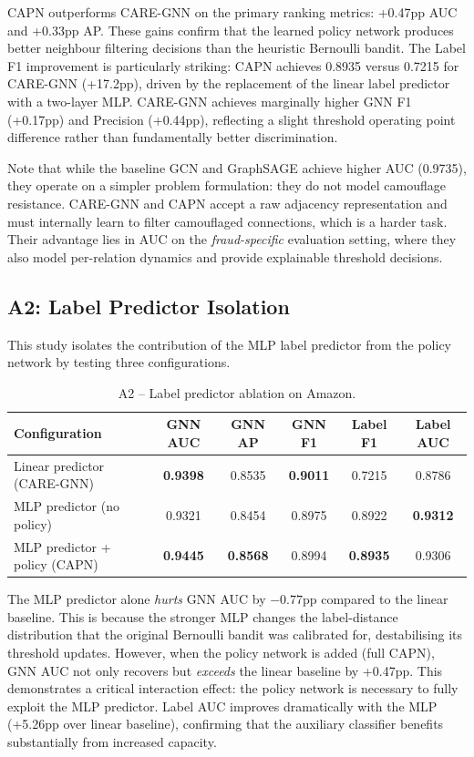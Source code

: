 \noindent
CAPN outperforms CARE-GNN on the primary ranking metrics: +0.47pp AUC and +0.33pp AP. These gains confirm that the learned policy network produces better neighbour filtering decisions than the heuristic Bernoulli bandit. The Label F1 improvement is particularly striking: CAPN achieves 0.8935 versus 0.7215 for CARE-GNN (+17.2pp), driven by the replacement of the linear label predictor with a two-layer MLP. CARE-GNN achieves marginally higher GNN F1 (+0.17pp) and Precision (+0.44pp), reflecting a slight threshold operating point difference rather than fundamentally better discrimination.

Note that while the baseline GCN and GraphSAGE achieve higher AUC (0.9735), they operate on a simpler problem formulation: they do not model camouflage resistance. CARE-GNN and CAPN accept a raw adjacency representation and must internally learn to filter camouflaged connections, which is a harder task. Their advantage lies in AUC on the \textit{fraud-specific} evaluation setting, where they also model per-relation dynamics and provide explainable threshold decisions.


\subsection{A2: Label Predictor Isolation}

This study isolates the contribution of the MLP label predictor from the policy network by testing three configurations.

\begin{table}[h!]
\centering
\begin{tabular}{lccccc}
\toprule
\textbf{Configuration} & \textbf{GNN AUC} & \textbf{GNN AP} & \textbf{GNN F1} & \textbf{Label F1} & \textbf{Label AUC} \\
\midrule
Linear predictor (CARE-GNN) & \textbf{0.9398} & 0.8535 & \textbf{0.9011} & 0.7215 & 0.8786 \\
MLP predictor (no policy)   & 0.9321 & 0.8454 & 0.8975 & 0.8922 & \textbf{0.9312} \\
MLP predictor + policy (CAPN) & \textbf{0.9445} & \textbf{0.8568} & 0.8994 & \textbf{0.8935} & 0.9306 \\
\bottomrule
\end{tabular}
\caption{A2 -- Label predictor ablation on Amazon.}
\label{tab:a2-label}
\end{table}

\noindent
The MLP predictor alone \emph{hurts} GNN AUC by $-0.77$pp compared to the linear baseline. This is because the stronger MLP changes the label-distance distribution that the original Bernoulli bandit was calibrated for, destabilising its threshold updates. However, when the policy network is added (full CAPN), GNN AUC not only recovers but \emph{exceeds} the linear baseline by +0.47pp. This demonstrates a critical interaction effect: the policy network is necessary to fully exploit the MLP predictor. Label AUC improves dramatically with the MLP (+5.26pp over linear baseline), confirming that the auxiliary classifier benefits substantially from increased capacity.

